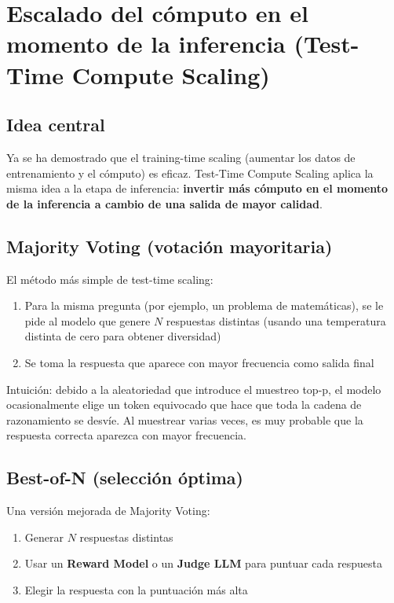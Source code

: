 \section{Escalado del cómputo en el momento de la inferencia (Test-Time Compute Scaling)}

\subsection{Idea central}

Ya se ha demostrado que el training-time scaling (aumentar los datos de entrenamiento y el cómputo) es eficaz. Test-Time Compute Scaling aplica la misma idea a la etapa de inferencia: \textbf{invertir más cómputo en el momento de la inferencia a cambio de una salida de mayor calidad}.

\subsection{Majority Voting (votación mayoritaria)}

El método más simple de test-time scaling:

\begin{enumerate}
    \item Para la misma pregunta (por ejemplo, un problema de matemáticas), se le pide al modelo que genere $N$ respuestas distintas (usando una temperatura distinta de cero para obtener diversidad)
    \item Se toma la respuesta que aparece con mayor frecuencia como salida final
\end{enumerate}

Intuición: debido a la aleatoriedad que introduce el muestreo top-p, el modelo ocasionalmente elige un token equivocado que hace que toda la cadena de razonamiento se desvíe. Al muestrear varias veces, es muy probable que la respuesta correcta aparezca con mayor frecuencia.

\subsection{Best-of-N (selección óptima)}

Una versión mejorada de Majority Voting:

\begin{enumerate}
    \item Generar $N$ respuestas distintas
    \item Usar un \textbf{Reward Model} o un \textbf{Judge LLM} para puntuar cada respuesta
    \item Elegir la respuesta con la puntuación más alta
\end{enumerate}

